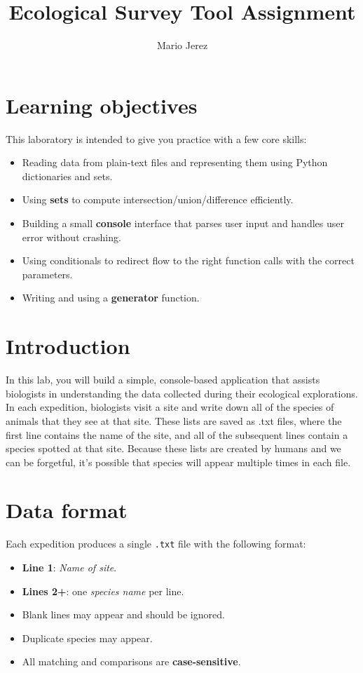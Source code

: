 \documentclass[12pt,letterpaper]{article}
\title{Ecological Survey Tool Assignment}
\date{}
\author{Mario Jerez}
\begin{document}
\maketitle

\section*{Learning objectives}
This laboratory is intended to give you practice with a few core skills:
\begin{itemize}
  \item Reading data from plain-text files and representing them using Python dictionaries and sets.
  \item Using \textbf{sets} to compute intersection/union/difference efficiently.
  \item Building a small \textbf{console} interface that parses user input and handles user error without crashing.
  \item Using conditionals to redirect flow to the right function calls with the correct parameters.
  \item Writing and using a \textbf{generator} function.
\end{itemize}

\section{Introduction}

In this lab, you will build a simple, console-based application that assists biologists in understanding the data collected during their ecological explorations. In each expedition, biologists visit a site and write down all of the species of animals that they see at that site. These lists are saved as .txt files, where the first line contains the name of the site, and all of the subsequent lines contain a species spotted at that site. Because these lists are created by humans and we can be forgetful, it's possible that species will appear multiple times in each file.


\section{Data format}
Each expedition produces a single \texttt{.txt} file with the following format:
\begin{itemize}
  \item \textbf{Line 1}: \emph{Name of site}.
  \item \textbf{Lines 2+}: one \emph{species name} per line.
  \item Blank lines may appear and should be ignored.
  \item Duplicate species may appear.
  \item All matching and comparisons are \textbf{case-sensitive}.
\end{itemize}
\end{document}
